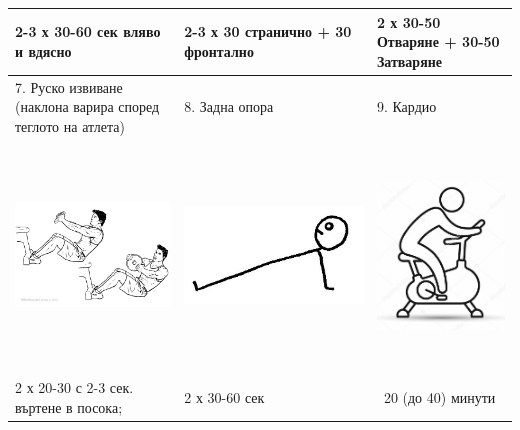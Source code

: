 \documentclass{article}
\begin{document}
\begin{tabular}{ | m{5cm} | m{5cm} | m{5cm} | }
2-3 х 30-60 сек вляво и вдясно & 2-3 х 30 странично + 30 фронтално & 2 х 30-50 Отваряне + 30-50 Затваряне \\ 
\hline
7. Руско извиване (наклона варира според теглото на атлета)& 
8. Задна опора & 
9. Кардио\\ 
\begin{minipage}{5cm} \includegraphics[width=\linewidth, height=60mm]{day_C_ex_7_Russian_Twist.png} \end{minipage} &
\begin{minipage}{5cm} \includegraphics[width=\linewidth, height=60mm]{day_C_ex_8_reverse-plank.jpg} \end{minipage} & 
\begin{minipage}{5cm} \includegraphics[width=\linewidth, height=60mm]{day_C_ex_9_cardio.jpg} \end{minipage} \\
2 х 20-30 с 2-3 сек. въртене в посока;& 2 х 30-60 сек & ~20 (до 40) минути \\ 
\hline
\end{tabular}
\end{document}
